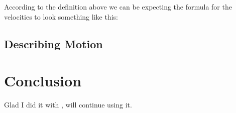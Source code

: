 \documentclass[12pt]{article}
\begin{document}
According to the definition above we can be expecting the formula for the velocities to look something like this:


\begin{center}
\end{center}

\subsection{Describing Motion}



\section{Conclusion}
Glad I did it with \LaTeXe\cite{latex2e}, will continue using it.



\end{document}
